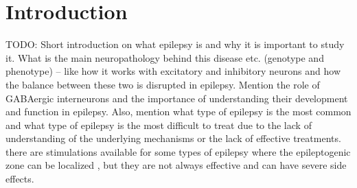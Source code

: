 \documentclass[10pt]{article}
\begin{document}
\begin{sloppypar}
  \begin{abstract}
  \end{abstract}

  \pagebreak
  \tableofcontents
  \pagebreak
  \listoffigures
  \pagebreak


  \section{Introduction}
  \label{sec:introduction}

  TODO: Short introduction on what epilepsy is and why it is important to study it. What is the main neuropathology behind this disease etc. (genotype and phenotype) – like how it works with excitatory and inhibitory neurons and how the balance between these two is disrupted in epilepsy. Mention the role of GABAergic interneurons and the importance of understanding their development and function in epilepsy. Also, mention what type of epilepsy is the most common and what type of epilepsy is the most difficult to treat due to the lack of understanding of the underlying mechanisms or the lack of effective treatments. there are stimulations available for some types of epilepsy where the epileptogenic zone can be localized , but they are not always effective and can have severe side effects.


\end{sloppypar}
\end{document}
